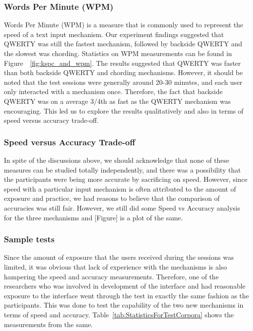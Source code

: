 \subsubsection{Words Per Minute (WPM)}

Words Per Minute (WPM) is a measure that is commonly used to represent
the speed of a text input mechanism. Our experiment findings suggested
that QWERTY was still the fastest mechanism, followed by backside
QWERTY and the slowest was chording. Statistics on WPM measurements
can be found in Figure~~\ref{fig:kspc_and_wpm}.  The results suggested
that QWERTY was faster than both backside QWERTY and chording
mechanisms. However, it should be noted that the test sessions were
generally around 20-30 minutes, and each user only interacted with a
mechanism once. Therefore, the fact that backside QWERTY was on a
average 3/4th as fast as the QWERTY mechanism was encouraging. This
led us to explore the results qualitatively and also in terms of speed
versus accuracy trade-off.

\subsubsection{Speed versus Accuracy Trade-off}

In spite of the discussions above, we should acknowledge that none of
these measures can be studied totally independently, and there was a
possibility that the participants were being more accurate by
sacrificing on speed. However, since speed with a particular input
mechanism is often attributed to the amount of exposure and practice,
we had reasons to believe that the comparison of accuracies was still
fair. However, we still did some Speed vs Accuracy analysis for the
three mechanisms and [Figure] is a plot of the same.

\subsubsection{Sample tests}

Since the amount of exposure that the users received during the
sessions was limited, it was obvious that lack of experience with the
mechanisms is also hampering the speed and accuracy
measurements. Therefore, one of the researchers who was involved in
development of the interface and had reasonable exposure to the
interface went through the test in exactly the same fashion as the
participants. This was done to test the capability of the two new
mechanisms in terms of speed and
accuracy. Table~\ref{tab:StatisticsForTestCorpora} shows the
measurements from the same.

